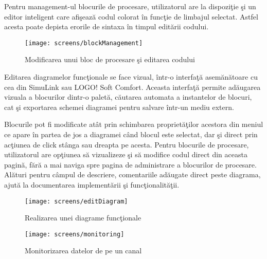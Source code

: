 Pentru management-ul blocurile de procesare, utilizatorul are la dispoziţie şi un editor inteligent care afişează codul colorat în funcţie de limbajul selectat. Astfel acesta poate depista erorile de sintaxa în timpul editării codului.
\begin{figure}[H]
	\centering
	\texttt{[image: screens/blockManagement]}
	\captionsetup{justification=centering}
	\caption{Modificarea unui bloc de procesare şi editarea codului}
	\label{fig:blockManagement}
\end{figure}
Editarea diagramelor funcţionale se face vizual, într-o interfaţă asemănătoare cu cea din SimuLink sau LOGO! Soft Comfort. Aceasta interfaţă permite adăugarea vizuala a blocurilor dintr-o paletă, căutarea automata a instantelor de blocuri, cat şi exportarea schemei diagramei pentru salvare într-un mediu extern. 

Blocurile pot fi modificate atât prin schimbarea proprietăţilor acestora din meniul ce apare în partea de jos a diagramei când blocul este selectat, dar şi direct prin acţiunea de click stânga sau dreapta pe acesta. Pentru blocurile de procesare, utilizatorul are opţiunea să vizualizeze şi să modifice codul direct din aceasta pagină, fără a mai naviga spre pagina de administrare a blocurilor de procesare.
Alături pentru câmpul de descriere, comentariile adăugate direct peste diagrama, ajută la documentarea implementării şi funcţionalităţii.
\begin{figure}[H]
	\centering
	\texttt{[image: screens/editDiagram]}
	\captionsetup{justification=centering}
	\caption{Realizarea unei diagrame funcţionale}
	\label{fig:editDiagram}
\end{figure}

\begin{figure}[H]
	\centering
	\texttt{[image: screens/monitoring]}
	\captionsetup{justification=centering}
	\caption{Monitorizarea datelor de pe un canal}
	\label{fig:monitoring}
\end{figure}